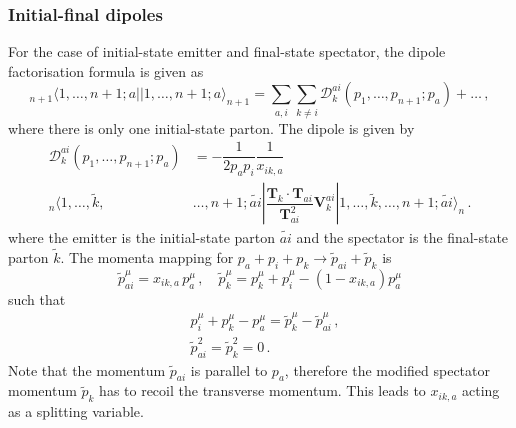 \documentclass[main.tex]{subfiles}
\begin{document}
        \subsubsection{Initial-final dipoles}
        For the case of initial-state emitter and final-state spectator,
        the dipole factorisation formula is given as
        \begin{equation}\label{eqn:IF_factorisation}
            {}_{n+1} \langle 1, \ldots, n+1; a || 1, \ldots, n+1; a \rangle_{n+1} = \sum_{a,i}\sum_{k \neq i}\mathcal{D}_{k}^{ai}(p_{1},\ldots,p_{n+1};p_{a}) + \ldots \, ,
        \end{equation}
        where there is only one initial-state parton. The dipole is given by
        \begin{equation}\label{eqn:D_aik}
            \begin{split}
            \mathcal{D}_{k}^{ai}(p_{1}, \ldots, p_{n+1};p_{a}) &= -\dfrac{1}{2p_{a}p_{i}}\dfrac{1}{x_{ik,a}} \\
            {}_{n}\langle 1, \ldots, \tilde{k}, &\ldots, n+1 ; \widetilde{ai} | \dfrac{\boldsymbol{T}_{k} \cdot \boldsymbol{T}_{ai}}{\boldsymbol{T}_{ai}^{2}} \boldsymbol{V}_{k}^{ai} | 1, \ldots, \tilde{k}, \ldots, n+1; \widetilde{ai} \rangle_{n} \, .
            \end{split}
        \end{equation}
        where the emitter is the initial-state parton $\widetilde{ai}$
        and the spectator is the final-state parton $\tilde{k}$.
        The momenta mapping for $p_{a} + p_{i} + p_{k} \rightarrow \tilde{p}_{ai} + \tilde{p}_{k}$ is
        \begin{equation}\label{eqn:IF_mapping}
            \tilde{p}_{ai}^{\mu} = x_{ik,a} \, p_{a}^{\mu} \, , \quad \tilde{p}_{k}^{\mu} = p_{k}^{\mu} + p_{i}^{\mu} - (1-x_{ik,a})p_{a}^{\mu} 
        \end{equation}
        such that
        \begin{equation}\label{eqn:IF_mapping_conditions}
            \begin{split}
            &p_{i}^{\mu} + p_{k}^{\mu} - p_{a}^{\mu} = \tilde{p}_{k}^{\mu} - \tilde{p}_{ai}^{\mu} \, , \\
            &\tilde{p}_{ai}^{2} = \tilde{p}_{k}^{2} = 0 \, .
            \end{split}
        \end{equation}
        Note that the momentum $\tilde{p}_{ai}$ is parallel
        to $p_{a}$, therefore the modified spectator momentum $\tilde{p}_{k}$
        has to recoil the transverse momentum. This leads to $x_{ik,a}$
        acting as a splitting variable.
\end{document}
